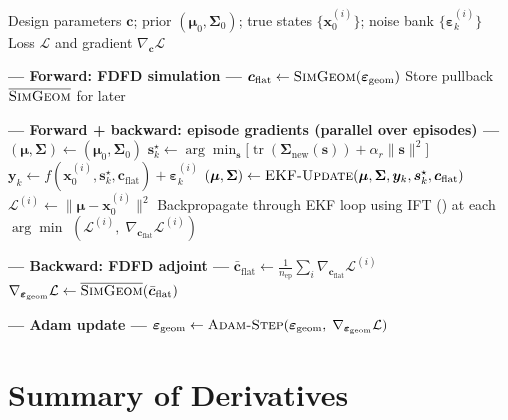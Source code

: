\documentclass[11pt]{article}
\newcommand{\tr}{\operatorname{tr}}
\newcommand{\bx}{\bm{x}}
\newcommand{\by}{\bm{y}}
\newcommand{\bs}{\bm{s}}
\newcommand{\bc}{\bm{c}}
\newcommand{\bmu}{\bm{\mu}}
\newcommand{\bep}{\bm{\varepsilon}}
\newcommand{\sstar}{\bs^{\star}}
\newcommand{\Snew}{\bm{\Sigma}_{\mathrm{new}}}
\theoremstyle{definition}
\begin{document}
\begin{algorithm}[h]
\caption{One training iteration (outer gradient step)}
\label{alg:training}
\begin{algorithmic}[1]
\Require Design parameters $\bc$; prior $(\bmu_0, \bm{\Sigma}_0)$;
  true states $\{\bx_0^{(i)}\}$; noise bank $\{\bep_k^{(i)}\}$
\Ensure Loss $\mathcal{L}$ and gradient $\nabla_{\bc}\mathcal{L}$

\Statex \textbf{--- Forward: FDFD simulation ---}
\State $\bc_{\mathrm{flat}} \gets \textsc{SimGeom}(\bm{\varepsilon}_{\mathrm{geom}})$
\State Store pullback $\overline{\textsc{SimGeom}}$ for later

\Statex \textbf{--- Forward + backward: episode gradients (parallel over episodes) ---}
  \State $(\bmu, \bm{\Sigma}) \gets (\bmu_0, \bm{\Sigma}_0)$
    \State $\sstar_k \gets \arg\min_{\bs}\bigl[\tr(\Snew(\bs))
      + \alpha_r\|\bs\|^2\bigr]$
    \State $\by_k \gets f(\bx_0^{(i)}, \sstar_k, \bc_{\mathrm{flat}})
      + \bep_k^{(i)}$
    \State $(\bmu, \bm{\Sigma}) \gets \textsc{EKF-Update}(\bmu, \bm{\Sigma},
      \by_k, \sstar_k, \bc_{\mathrm{flat}})$
  \EndFor
  \State $\mathcal{L}^{(i)} \gets \|\bmu - \bx_0^{(i)}\|^2$
  \State Backpropagate through EKF loop using IFT ()
    at each $\arg\min$
  \State \Return $(\mathcal{L}^{(i)},\; \nabla_{\bc_{\mathrm{flat}}}
    \mathcal{L}^{(i)})$
\EndFor

\Statex \textbf{--- Backward: FDFD adjoint ---}
\State $\bar{\bc}_{\mathrm{flat}} \gets
  \frac{1}{n_{\mathrm{ep}}}\sum_i \nabla_{\bc_{\mathrm{flat}}}
  \mathcal{L}^{(i)}$
\State $\nabla_{\bm{\varepsilon}_{\mathrm{geom}}}\mathcal{L}
  \gets \overline{\textsc{SimGeom}}(\bar{\bc}_{\mathrm{flat}})$

\Statex \textbf{--- Adam update ---}
\State $\bm{\varepsilon}_{\mathrm{geom}} \gets
  \textsc{Adam-Step}(\bm{\varepsilon}_{\mathrm{geom}},\;
  \nabla_{\bm{\varepsilon}_{\mathrm{geom}}}\mathcal{L})$
\end{algorithmic}
\end{algorithm}

\section{Summary of Derivatives}
\label{sec:derivatives}
\end{document}
